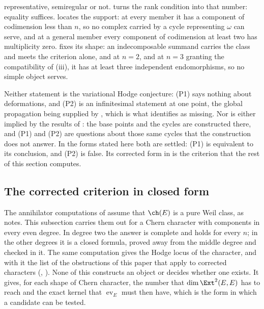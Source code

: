 \begin{remark}
\begin{enumerate}[label=\textup{(P\arabic*)},leftmargin=*]
  representative, semiregular or not.  turns the rank
  condition into that number: equality suffices.  locates
  the support: at every member it has a component of codimension less than
  $n$, so no complex carried by a cycle representing $\omega$ can serve, and
  at a general member every component of codimension at least two has
  multiplicity zero.
   fixes its shape: an indecomposable summand carries the
  class and meets the criterion alone, and at $n=2$, and at $n=3$ granting
  the compatibility of (iii), it has at least three
  independent endomorphisms, so no simple object serves.
\end{enumerate}

Neither statement is the variational Hodge conjecture: (P1) says nothing
about deformations, and (P2) is an infinitesimal statement at one point, the
global propagation being supplied by , which is what
 identifies as missing. Nor is either implied by the
results of : the base points and the cycles are
constructed there, and (P1) and (P2) are questions about those same cycles
that the construction does not answer. In the forms stated here both are
settled: (P1) is equivalent to its conclusion, and (P2) is false. Its
corrected form in  is the criterion that the rest of this
section computes.
\end{remark}

\subsection{The corrected criterion in closed form}

The annihilator computations of  assume that $\ch(E)$
is a pure Weil class, as  notes. This subsection carries
them out for a Chern character with components in every even degree. In
degree two the answer is complete and holds for every $n$; in the other
degrees it is a closed formula, proved away from the middle degree and
checked in it. The same computation gives the Hodge locus of the character,
and with it the list of the obstructions of this paper that apply to
corrected characters (, ).
None of this constructs an object or decides whether one exists. It gives,
for each shape of Chern character, the number that $\dim\Ext^{2}(E,E)$ has
to reach and the exact kernel that $\operatorname{ev}_{E}$ must then have,
which is the form in which a candidate can be tested.

